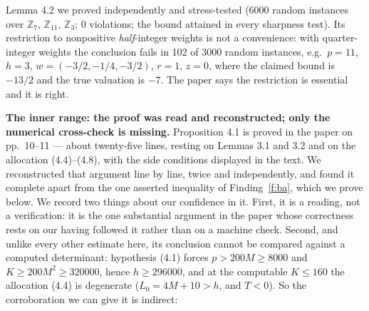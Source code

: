 \documentclass[11pt]{article}
\theoremstyle{definition}
\begin{document}
Lemma 4.2 we proved independently and stress-tested (6000 random instances over
$\mathbb{Z}_7$, $\mathbb{Z}_{11}$, $\mathbb{Z}_3$; 0 violations; the bound attained in every
sharpness test). Its restriction to nonpositive \emph{half}-integer weights is not a
convenience: with quarter-integer weights the conclusion fails in 102 of 3000 random
instances, e.g.\ $p=11$, $h=3$, $w=(-3/2,-1/4,-3/2)$, $r=1$, $z=0$, where the claimed bound is
$-13/2$ and the true valuation is $-7$. The paper says the restriction is essential and it is
right.

\textbf{The inner range: the proof was read and reconstructed; only the numerical cross-check
is missing.} Proposition 4.1 is proved in the paper on pp.~10--11 --- about twenty-five lines,
resting on Lemmas 3.1 and 3.2 and on the allocation (4.4)--(4.8), with the side conditions
displayed in the text. We reconstructed that argument line by line, twice and independently, and
found it complete apart from the one asserted inequality of Finding~\ref{f:ba}, which we prove
below. We record two things about our confidence in it. First, it is a reading, not a
verification: it is the one substantial argument in the paper whose correctness rests on our
having followed it rather than on a machine check. Second, and unlike every other estimate here,
its conclusion cannot be compared against a computed determinant: hypothesis (4.1) forces
$p>200M\ge8000$ and $K\ge200M^2\ge320000$, hence $h\ge296000$, and at the computable $K\le160$ the
allocation (4.4) is degenerate ($L_0=4M+10>h$, and $T<0$). So the corroboration we can give it is
indirect:
\end{document}
